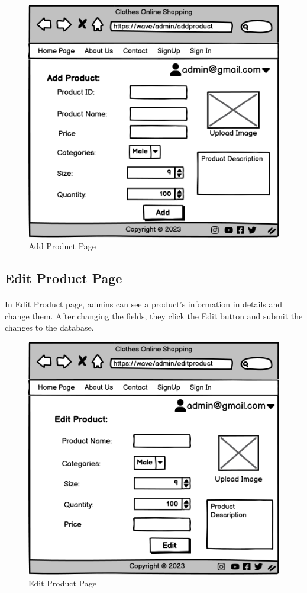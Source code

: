 \bigskip
\bigskip
\bigskip
\begin{figure}[h]
\centerline{\includegraphics[scale=1.]{images/Add Product.png}}
\caption{Add Product Page}
\label{fig}
\end{figure}

\newpage
\subsection{Edit Product Page}
\bigskip
\paragraph{}
In Edit Product page, admins can see a product's information in details and change them. After changing the fields, they click the Edit button and submit the changes to the database. 
\bigskip
\bigskip
\bigskip
\begin{figure}[h]
\centerline{\includegraphics[scale=1.]{images/Edit Product.png}}
\caption{Edit Product Page}
\label{fig}
\end{figure}